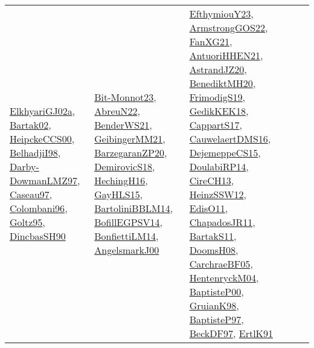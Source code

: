 {\begin{longtable}{lp{3cm}>{\raggedright}p{6cm}>{\raggedright}p{6cm}p{8cm}}
\href{papers/ElkhyariGJ02a.pdf}{ElkhyariGJ02a}\cite{ElkhyariGJ02a}, \href{papers/Bartak02.pdf}{Bartak02}\cite{Bartak02}, \href{articles/HeipckeCCS00.pdf}{HeipckeCCS00}\cite{HeipckeCCS00}, \href{articles/BelhadjiI98.pdf}{BelhadjiI98}\cite{BelhadjiI98}, \href{articles/Darby-DowmanLMZ97.pdf}{Darby-DowmanLMZ97}\cite{Darby-DowmanLMZ97}, \href{papers/Caseau97.pdf}{Caseau97}\cite{Caseau97}, \href{papers/Colombani96.pdf}{Colombani96}\cite{Colombani96}, \href{papers/Goltz95.pdf}{Goltz95}\cite{Goltz95}, \href{articles/DincbasSH90.pdf}{DincbasSH90}\cite{DincbasSH90} & \href{papers/Bit-Monnot23.pdf}{Bit-Monnot23}\cite{Bit-Monnot23}, \href{articles/AbreuN22.pdf}{AbreuN22}\cite{AbreuN22}, \href{papers/BenderWS21.pdf}{BenderWS21}\cite{BenderWS21}, \href{papers/GeibingerMM21.pdf}{GeibingerMM21}\cite{GeibingerMM21}, \href{papers/BarzegaranZP20.pdf}{BarzegaranZP20}\cite{BarzegaranZP20}, \href{papers/DemirovicS18.pdf}{DemirovicS18}\cite{DemirovicS18}, \href{papers/HechingH16.pdf}{HechingH16}\cite{HechingH16}, \href{papers/GayHLS15.pdf}{GayHLS15}\cite{GayHLS15}, \href{papers/BartoliniBBLM14.pdf}{BartoliniBBLM14}\cite{BartoliniBBLM14}, \href{papers/BofillEGPSV14.pdf}{BofillEGPSV14}\cite{BofillEGPSV14}, \href{papers/BonfiettiLM14.pdf}{BonfiettiLM14}\cite{BonfiettiLM14}, \href{papers/AngelsmarkJ00.pdf}{AngelsmarkJ00}\cite{AngelsmarkJ00} & \href{papers/EfthymiouY23.pdf}{EfthymiouY23}\cite{EfthymiouY23}, \href{papers/ArmstrongGOS22.pdf}{ArmstrongGOS22}\cite{ArmstrongGOS22}, \href{articles/FanXG21.pdf}{FanXG21}\cite{FanXG21}, \href{papers/AntuoriHHEN21.pdf}{AntuoriHHEN21}\cite{AntuoriHHEN21}, \href{articles/AstrandJZ20.pdf}{AstrandJZ20}\cite{AstrandJZ20}, \href{articles/BenediktMH20.pdf}{BenediktMH20}\cite{BenediktMH20}, \href{papers/FrimodigS19.pdf}{FrimodigS19}\cite{FrimodigS19}, \href{articles/GedikKEK18.pdf}{GedikKEK18}\cite{GedikKEK18}, \href{papers/CappartS17.pdf}{CappartS17}\cite{CappartS17}, \href{papers/CauwelaertDMS16.pdf}{CauwelaertDMS16}\cite{CauwelaertDMS16}, \href{papers/DejemeppeCS15.pdf}{DejemeppeCS15}\cite{DejemeppeCS15}, \href{papers/DoulabiRP14.pdf}{DoulabiRP14}\cite{DoulabiRP14}, \href{papers/CireCH13.pdf}{CireCH13}\cite{CireCH13}, \href{articles/HeinzSSW12.pdf}{HeinzSSW12}\cite{HeinzSSW12}, \href{papers/EdisO11.pdf}{EdisO11}\cite{EdisO11}, \href{papers/ChapadosJR11.pdf}{ChapadosJR11}\cite{ChapadosJR11}, \href{articles/BartakS11.pdf}{BartakS11}\cite{BartakS11}, \href{papers/DoomsH08.pdf}{DoomsH08}\cite{DoomsH08}, \href{papers/CarchraeBF05.pdf}{CarchraeBF05}\cite{CarchraeBF05}, \href{papers/HentenryckM04.pdf}{HentenryckM04}\cite{HentenryckM04}, \href{articles/BaptisteP00.pdf}{BaptisteP00}\cite{BaptisteP00}, \href{papers/GruianK98.pdf}{GruianK98}\cite{GruianK98}, \href{papers/BaptisteP97.pdf}{BaptisteP97}\cite{BaptisteP97}, \href{papers/BeckDF97.pdf}{BeckDF97}\cite{BeckDF97}, \href{papers/ErtlK91.pdf}{ErtlK91}\cite{ErtlK91}\\

\end{longtable}}
